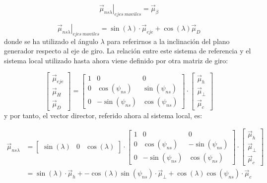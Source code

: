 \begin{equation}
\left.\vec{\mu}_{ns\lambda}\right|_{ejes\ moviles}=\vec{\mu}_{\beta}\end{equation}


\begin{equation}
\left.\vec{\mu}_{ns\lambda}\right|_{ejes\ moviles}=\sin(\lambda)\cdot\vec{\mu}_{eje}+\cos(\lambda)\vec{\mu}_{D}\end{equation}
donde se ha utilizado el ángulo $\lambda$ para referirnos a la inclinación
del plano generador respecto al eje de giro.  
La relación entre este sistema de referencia y el sistema local utilizado
hasta ahora viene definido por otra matriz de giro:

\begin{equation}
\left[\begin{array}{c}
\vec{\mu}_{eje}\\
\vec{\mu}_{H}\\
\vec{\mu}_{D}\end{array}\right]=\left[\begin{array}{ccc}
1 & 0 & 0\\
0 & \cos(\psi_{ns}) & \sin(\psi_{ns})\\
0 & -\sin(\psi_{ns}) & \cos(\psi_{ns})\end{array}\right]\cdot\left[\begin{array}{c}
\vec{\mu}_{h}\\
\vec{\mu}_{\bot}\\
\vec{\mu}_{c}\end{array}\right]\end{equation}
y por tanto, el vector director, referido ahora al sistema local,
es:

\begin{align}
\vec{\mu}_{ns\lambda} & =\left[\begin{array}{ccc}
\sin(\lambda) & 0 & \cos(\lambda)\end{array}\right]\cdot\left[\begin{array}{ccc}
1 & 0 & 0\\
0 & \cos(\psi_{ns}) & -\sin(\psi_{ns})\\
0 & -\sin(\psi_{ns}) & \cos(\psi_{ns})\end{array}\right]\cdot\left[\begin{array}{c}
\vec{\mu}_{h}\\
\vec{\mu}_{\bot}\\
\vec{\mu}_{c}\end{array}\right]\nonumber \\
 & =\sin(\lambda)\cdot\vec{\mu}_{h}+-\cos(\lambda)\sin(\psi_{ns})\cdot\vec{\mu}_{\bot}+\cos(\lambda)\cos(\psi_{ns})\cdot\vec{\mu}_{c}\label{eq:VectorSolarNSInclinado}\end{align}


